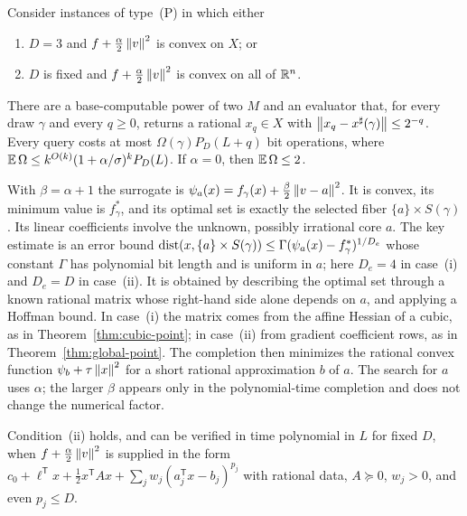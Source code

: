 \begin{theorem}
\label{thm:recourse-convexified}
Consider instances of type~(P) in which either
\begin{enumerate}[label=(\roman*)]
\item $D=3$ and $f+\frac\alpha2\left\lVert v\right\rVert^2$ is convex on $X$; or
\item $D$ is fixed and $f+\frac\alpha2\left\lVert v\right\rVert^2$ is convex on all of
$\mathbb R^n$.
\end{enumerate}
There are a base-computable power of two $M$ and an evaluator that, for
every draw $\gamma$ and every $q\ge0$, returns a rational
$x_q\in X$ with $\left\lVert x_q-x^\sharp(\gamma)\right\rVert\le2^{-q}$. Every query
costs at most $\Omega(\gamma)P_D(L+q)$ bit operations, where
$\mathbb E\,\Omega\le k^{O(k)}(1+\alpha/\sigma)^kP_D(L)$. If $\alpha=0$, then
$\mathbb E\,\Omega\le2$.
\end{theorem}

With $\beta=\alpha+1$ the surrogate is
$\psi_a(x)=f_\gamma(x)+\frac\beta2\left\lVert v-a\right\rVert^2$. It is convex, its
minimum value is $f_\gamma^*$, and its optimal set is exactly the
selected fiber $\{a\}\times S(\gamma)$. Its linear coefficients involve
the unknown, possibly irrational core $a$. The key estimate is an error
bound $\operatorname{dist}(x,\{a\}\times S(\gamma))\le\Gamma(\psi_a(x)-f_\gamma^*)^{1/D_e}$
whose constant $\Gamma$ has polynomial bit length and is uniform in
$a$; here $D_e=4$ in case~(i) and $D_e=D$ in case~(ii). It is obtained
by describing the optimal set through a known rational matrix whose
right-hand side alone depends on $a$, and applying a Hoffman bound. In
case~(i) the matrix comes from the affine Hessian of a cubic, as in
Theorem~\ref{thm:cubic-point}; in case~(ii) from gradient coefficient
rows, as in Theorem~\ref{thm:global-point}. The completion then minimizes
the rational convex function $\psi_b+\tau\left\lVert x\right\rVert^2$ for a short rational
approximation $b$ of $a$. The search for $a$ uses $\alpha$; the larger
$\beta$ appears only in the polynomial-time completion and does not
change the numerical factor.

\begin{corollary}
\label{cor:recourse-affine-power}
Condition~(ii) holds, and can be verified in time polynomial in $L$
for fixed $D$, when
$f+\frac\alpha2\left\lVert v\right\rVert^2$ is supplied in the form
$c_0+\ell^{\mathsf T}x+\frac12x^{\mathsf T}Ax
 +\sum_jw_j(a_j^{\mathsf T}x-b_j)^{p_j}$
with rational data, $A\succeq0$, $w_j>0$, and even $p_j\le D$.
\end{corollary}

